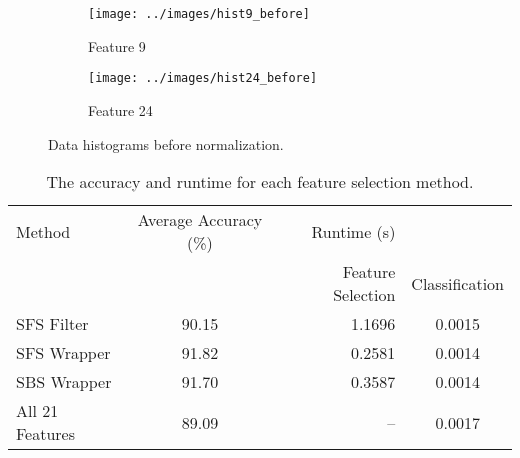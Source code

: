 \documentclass[]{article}
\begin{document}
\begin{figure}[p]
\centering
\begin{subfigure}{.5\textwidth}
  \centering
  \texttt{[image: ../images/hist9\_before]}
  \caption{Feature 9}
  \label{fig:sub1}
\end{subfigure}%

\begin{subfigure}{.5\textwidth}
  \centering
  \texttt{[image: ../images/hist24\_before]}
  \caption{Feature 24}
  \label{fig:sub2}
\end{subfigure}
\caption{Data histograms before normalization.}
\label{fig:hist1}
\end{figure}




































	

\begin{table}[h]
	\begin{center}
	 \caption{The accuracy and runtime for each feature selection method.}
	 \begin{tabular}{ | l | c | r  c  |}
	    \hline
	    Method & Average Accuracy (\%) & Runtime (s) &\\ 
	     &  & Feature Selection & Classification\\ 
	    \hline
	    
	    SFS Filter & 90.15 & 1.1696 & 0.0015 \\ 
	    SFS Wrapper & 91.82 & 0.2581 & 0.0014 \\
	    SBS Wrapper & 91.70 & 0.3587 & 0.0014\\
	    All 21 Features & 89.09 & -- & 0.0017\\
	    \hline    
	 \end{tabular}
	    \label{table:sfssbstable}
	\end{center}
\end{table}
\end{document}
